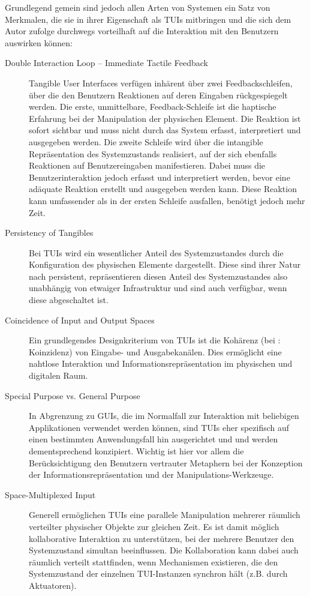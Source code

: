 Grundlegend gemein sind jedoch allen Arten von Systemen ein Satz von Merkmalen, die sie in ihrer Eigenschaft als \glspl{TUI} mitbringen und die sich dem Autor zufolge durchwegs vorteilhaft auf die Interaktion mit den Benutzern auswirken können:
\begin{description}
	\item[Double Interaction Loop -- Immediate Tactile Feedback] Tangible User Interfaces verfügen inhärent über zwei Feedbackschleifen, über die den Benutzern Reaktionen auf deren Eingaben rückgespiegelt werden. Die erste, unmittelbare, Feedback-Schleife ist die haptische Erfahrung bei der Manipulation der physischen Element. Die Reaktion ist sofort sichtbar und muss nicht durch das System erfasst, interpretiert und ausgegeben werden. Die zweite Schleife wird über die intangible Repräsentation des Systemzustands realisiert, auf der sich ebenfalls Reaktionen auf Benutzereingaben manifestieren. Dabei muss die Benutzerinteraktion jedoch erfasst und interpretiert werden, bevor eine adäquate Reaktion erstellt und ausgegeben werden kann. Diese Reaktion kann umfassender als in der ersten Schleife ausfallen, benötigt jedoch mehr Zeit.
	\item[Persistency of Tangibles] Bei \glspl{TUI} wird ein wesentlicher Anteil des Systemzustandes durch die Konfiguration des physischen Elemente dargestellt. Diese sind ihrer Natur nach persistent, repräsentieren diesen Anteil des Systemzustandes also unabhängig von etwaiger Infrastruktur und sind auch verfügbar, wenn diese abgeschaltet ist.
	\item[Coincidence of Input and Output Spaces] Ein grundlegendes Designkriterium von \glspl{TUI} ist die Kohärenz (bei \citeauthor{Ishii08}: Koinzidenz) von Eingabe- und Ausgabekanälen. Dies ermöglicht eine nahtlose Interaktion und Informationsrepräsentation im physischen und digitalen Raum. 
	\item[Special Purpose vs. General Purpose] In Abgrenzung zu \glspl{GUI}, die im Normalfall zur Interaktion mit beliebigen Applikationen verwendet werden können, sind \glspl{TUI} eher spezifisch auf einen bestimmten Anwendungsfall hin ausgerichtet und und werden dementsprechend konzipiert. Wichtig ist hier vor allem die Berücksichtigung den Benutzern vertrauter Metaphern bei der Konzeption der Informationsrepräsentation und der Manipulations-Werkzeuge.
	\item[Space-Multiplexed Input] Generell ermöglichen \glspl{TUI} eine parallele Manipulation mehrerer räumlich verteilter physischer Objekte zur gleichen Zeit. Es ist damit möglich kollaborative Interaktion zu unterstützen, bei der mehrere Benutzer den Systemzustand simultan beeinflussen. Die Kollaboration kann dabei auch räumlich verteilt stattfinden, wenn Mechanismen existieren, die den Systemzustand der einzelnen \gls{TUI}-Instanzen synchron hält (z.B. durch Aktuatoren). 
\end{description}

